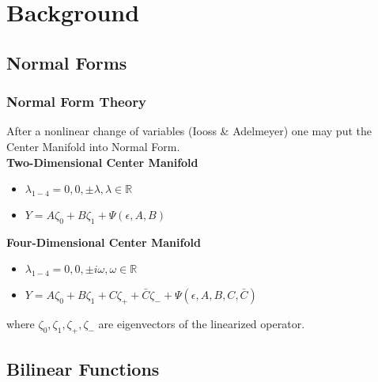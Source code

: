 \documentclass[10pt]{beamer}
\begin{document}

\section{Background}
\subsection{Normal Forms}

\frame
{
    \frametitle{Normal Form Theory}
    After a nonlinear change of variables (Iooss \& Adelmeyer) one may put the Center Manifold into Normal Form. \\
\bigskip
  {\bf{ Two-Dimensional Center Manifold }}
        \begin{itemize}
        \item $\lambda_{1-4} = 0, 0 , \pm \lambda, \lambda \in \mathbb{R} $
        \item $ Y = A \zeta_0 + B \zeta_1 + \Psi(\epsilon, A,B) $
        \end{itemize}
\bigskip
{\bf{   Four-Dimensional Center Manifold }}
        \begin{itemize}
        \item $\lambda_{1-4} = 0, 0 , \pm i \omega, \omega \in \mathbb{R} $
        \item $ Y = A \zeta_0 + B \zeta_1 + C \zeta_+ + \bar{C} \zeta_- + \Psi(\epsilon, A,B,C,\bar{C}) $
        \end{itemize}
\bigskip
    where $\zeta_0, \zeta_1, \zeta_+, \zeta_-$ are eigenvectors of the linearized operator.
}

\subsection{Bilinear Functions}
\end{document}
